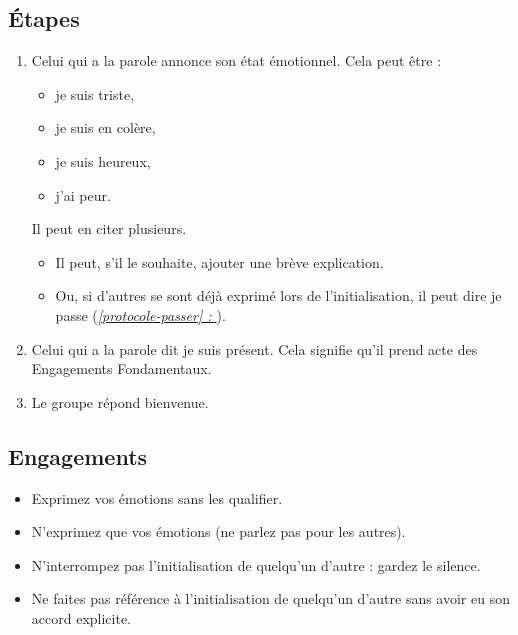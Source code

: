 \documentclass[paper=6in:9in,pagesize=pdftex,headinclude=on,footinclude=on,11pt]{scrbook}
\newcommand*{\fullref}[1]{\textit{\hyperref[{#1}]{\autoref*{#1} : \nameref*{#1}}}}
\begin{document}
\subsection{Étapes}
\begin{enumerate}
	\item Celui qui a la parole annonce son état émotionnel. Cela peut être :
		\begin{itemize}
			\item \og{}je suis triste\fg{},
			\item \og{}je suis en colère\fg{},
			\item \og{}je suis heureux\fg{},
			\item \og{}j'ai peur\fg{}.
		\end{itemize}
	      Il peut en citer plusieurs.
	      \begin{itemize}
	      	\item Il peut, s'il le souhaite, ajouter une brève explication.
	      	\item Ou, si d'autres se sont déjà exprimé lors de l'initialisation, il peut dire \og{}je passe\fg{} (\fullref{protocole-passer}).
	      \end{itemize}
	\item Celui qui a la parole dit \og{}je suis présent\fg{}. Cela signifie qu'il prend acte des Engagements Fondamentaux.
	\item Le groupe répond \og{}bienvenue\fg{}.
\end{enumerate}

\subsection{Engagements}
\begin{itemize}
	\item Exprimez vos émotions sans les qualifier.
	\item N'exprimez que vos émotions (ne parlez pas pour les autres).
	\item N'interrompez pas l'initialisation de quelqu'un d'autre : gardez le silence.
	\item Ne faites pas référence à l'initialisation de quelqu'un d'autre sans avoir eu son accord explicite.
\end{itemize}
\end{document}
